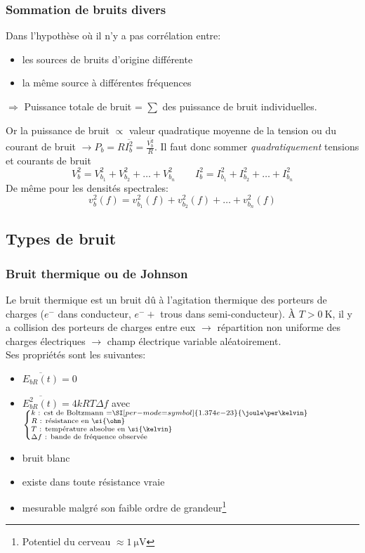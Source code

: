 \subsubsection{Sommation de bruits divers}
Dans l'hypothèse où il n'y a pas corrélation entre:
\begin{itemize}
	\item les sources de bruits d'origine différente
	\item la même source à différentes fréquences
\end{itemize}
\centerline{$\Rightarrow$ Puissance totale de bruit = $\sum$ des puissance de bruit individuelles.}
Or la puissance de bruit $\propto$ valeur quadratique moyenne de la tension ou du courant de bruit $\rightarrow P_b=R \overline{I^2_b} = \frac{\overline{V_b^2}}{R}$. Il faut donc sommer \emph{quadratiquement} tensions et courants de bruit 
\[
V_b^2 = V_{b_1}^2 + V_{b_2}^2 + \dots + V_{b_n}^2 \qquad I_b^2 = I_{b_1}^2 + I_{b_2}^2 + \dots + I_{b_n}^2
\]
De même pour les densités spectrales:
\[
v_b^2(f) = v_{b_1}^2(f) + v_{b_2}^2(f) + \dots + v_{b_n}^2(f)
\]
\subsection{Types de bruit}
\subsubsection{Bruit thermique ou de Johnson}
Le bruit thermique est un bruit dû à l'agitation thermique des porteurs de charges ($e^-$ dans conducteur, $e^-+$ trous dans semi-conducteur). À $T>\SI{0}{\kelvin}$, il y a collision des porteurs de charges entre eux $\rightarrow$ répartition non uniforme des charges électriques $\rightarrow$ champ électrique variable aléatoirement.\\

Ses propriétés sont les suivantes:
\begin{itemize}
	\item { $\overline{E_{bR}(t)}=0$} 
	\item { $\overline{E^2_{bR}(t)}=4kRT\Delta f$} avec $\left\{\substack{k\text{ : cst de Boltzmann }=\SI[per-mode=symbol]{1.374e-23}{\joule\per\kelvin}\\
	R \text{ : résistance en }\si{\ohm}\hfill \\
	T\text{ : température absolue en }\si{\kelvin}\hfill\\
	\Delta f\text{ : bande de fréquence observée}\hfill}\right.$
	\item bruit blanc
	\item existe dans toute résistance vraie
	\item mesurable malgré son faible ordre de grandeur\footnote{Potentiel du cerveau $\approx \SI{1}{\micro\volt}$}
\end{itemize}
